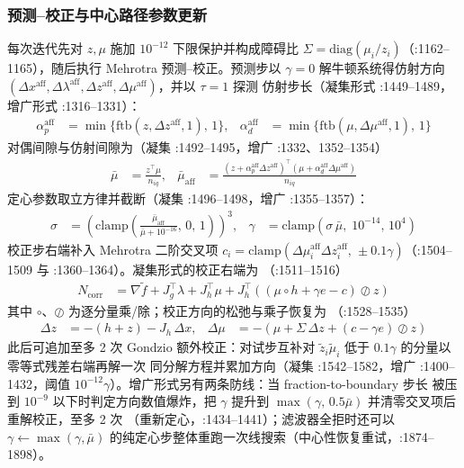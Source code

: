 \subsubsection*{预测--校正与中心路径参数更新}
每次迭代先对 $z,\mu$ 施加 $10^{-12}$ 下限保护并构成障碍比
$\Sigma=\mathrm{diag}(\mu_i/z_i)$（:1162--1165），随后执行
Mehrotra 预测--校正。预测步以 $\gamma=0$ 解牛顿系统得仿射方向
$(\Delta x^{\mathrm{aff}},\Delta\lambda^{\mathrm{aff}},
\Delta z^{\mathrm{aff}},\Delta\mu^{\mathrm{aff}})$，并以 $\tau=1$ 探测
仿射步长（凝集形式 :1449--1489，增广形式 :1316--1331）：
\begin{align*}
\alpha_p^{\mathrm{aff}} &= \min\{\mathrm{ftb}(z,\Delta z^{\mathrm{aff}},1),\,1\},
&
\alpha_d^{\mathrm{aff}} &= \min\{\mathrm{ftb}(\mu,\Delta\mu^{\mathrm{aff}},1),\,1\}
\end{align*}
对偶间隙与仿射间隙为（凝集 :1492--1495，增广 :1332、1352--1354）
\begin{align*}
\bar\mu &= \frac{z^{\top}\mu}{n_{iq}},
&
\bar\mu_{\mathrm{aff}} &=
\frac{(z+\alpha_p^{\mathrm{aff}}\Delta z^{\mathrm{aff}})^{\top}
      (\mu+\alpha_d^{\mathrm{aff}}\Delta\mu^{\mathrm{aff}})}{n_{iq}}
\end{align*}
定心参数取立方律并截断（凝集 :1496--1498，增广 :1355--1357）：
\begin{align*}
\sigma &= \left(\mathrm{clamp}\!\left(
  \frac{\bar\mu_{\mathrm{aff}}}{\bar\mu+10^{-16}},\,0,\,1\right)\right)^{3},
&
\gamma &= \mathrm{clamp}\!\left(\sigma\,\bar\mu,\;10^{-14},\,10^{4}\right)
\end{align*}
校正步右端补入 Mehrotra 二阶交叉项
$c_i=\mathrm{clamp}(\Delta\mu_i^{\mathrm{aff}}\Delta z_i^{\mathrm{aff}},
\,\pm 0.1\gamma)$（:1504--1509 与 :1360--1364）。凝集形式的校正右端为
（:1511--1516）
\begin{align*}
N_{\mathrm{corr}} &= \nabla\tilde f + J_g^{\top}\lambda + J_h^{\top}\mu
+ J_h^{\top}\!\left((\mu\circ h + \gamma e - c)\oslash z\right)
\end{align*}
其中 $\circ$、$\oslash$ 为逐分量乘/除；校正方向的松弛与乘子恢复为
（:1528--1535）
\begin{align*}
\Delta z &= -(h+z) - J_h\,\Delta x,
&
\Delta\mu &= -\left(\mu + \Sigma\,\Delta z + (c-\gamma e)\oslash z\right)
\end{align*}
此后可追加至多 2 次 Gondzio 额外校正：对试步互补对
$\tilde z_i\tilde\mu_i$ 低于 $0.1\gamma$ 的分量以零等式残差右端再解一次
同分解方程并累加方向（凝集 :1542--1582，增广 :1400--1432，阈值
$10^{-12}\gamma$）。增广形式另有两条防线：当 fraction-to-boundary 步长
被压到 $10^{-9}$ 以下时判定方向数值爆炸，把 $\gamma$ 提升到
$\max(\gamma,\,0.5\bar\mu)$ 并清零交叉项后重解校正，至多 2 次
（重新定心，:1434--1441）；滤波器全拒时还可以 $\gamma\leftarrow\max(\gamma,\bar\mu)$
的纯定心步整体重跑一次线搜索（中心性恢复重试，:1874--1898）。

